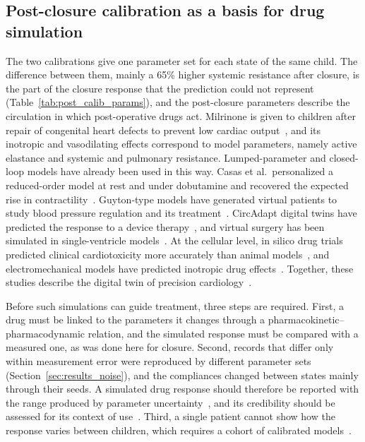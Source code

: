 \subsection{Post-closure calibration as a basis for drug simulation}
\label{sec:disc_drug}
The two calibrations give one parameter set for each state of the same child. The difference between them, mainly a 65\% higher systemic resistance after closure, is the part of the closure response that the prediction could not represent (Table~\ref{tab:post_calib_params}), and the post-closure parameters describe the circulation in which post-operative drugs act. Milrinone is given to children after repair of congenital heart defects to prevent low cardiac output~\cite{Hoffman2003}, and its inotropic and vasodilating effects correspond to model parameters, namely active elastance and systemic and pulmonary resistance. Lumped-parameter and closed-loop models have already been used in this way. Casas et al.\ personalized a reduced-order model at rest and under dobutamine and recovered the expected rise in contractility~\cite{Casas2018}. Guyton-type models have generated virtual patients to study blood pressure regulation and its treatment~\cite{Moss2012}. CircAdapt digital twins have predicted the response to a device therapy~\cite{Koopsen2024}, and virtual surgery has been simulated in single-ventricle models~\cite{Corsini2014}. At the cellular level, in silico drug trials predicted clinical cardiotoxicity more accurately than animal models~\cite{Passini2017}, and electromechanical models have predicted inotropic drug effects~\cite{Margara2021}. Together, these studies describe the digital twin of precision cardiology~\cite{CorralAcero2020}.

Before such simulations can guide treatment, three steps are required. First, a drug must be linked to the parameters it changes through a pharmacokinetic--pharmacodynamic relation, and the simulated response must be compared with a measured one, as was done here for closure. Second, records that differ only within measurement error were reproduced by different parameter sets (Section~\ref{sec:results_noise}), and the compliances changed between states mainly through their seeds. A simulated drug response should therefore be reported with the range produced by parameter uncertainty~\cite{Schiavazzi2017,Colebank2024Guidelines}, and its credibility should be assessed for its context of use~\cite{Viceconti2021}. Third, a single patient cannot show how the response varies between children, which requires a cohort of calibrated models~\cite{Niederer2020,Niederer2021}.

